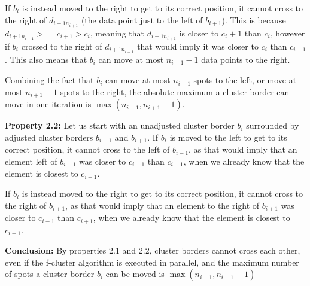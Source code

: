 \documentclass[conference]{IEEEtran}
\begin{document}
If $b_i$ is instead moved to the right to get to its correct position, it cannot cross to the right of $d_{i+1n_{i+1}}$ (the data point just to the left of $b_{i+1}$).
This is because $d_{i+1n_{i+1}} >= c_{i+1} > c_i$, meaning that $d_{i+1n_{i+1}}$ is closer to $c_i+1$ than $c_i$,
however if $b_i$ crossed to the right of $d_{i+1n_{i+1}}$ that would imply it was closer to $c_i$ than $c_{i+1}$.
This also means that $b_i$ can move at most $n_{i+1}-1$ data points to the right.

Combining the fact that $b_i$ can move at most $n_{i-1}$ spots to the left, or move at most $n_{i+1}-1$ spots to the right, the absolute maximum a cluster border can move in one iteration is $\max(n_{i-1}, n_{i+1}-1)$.

\textbf{Property 2.2:}
Let us start with an unadjusted cluster border $b_i$ surrounded by adjusted cluster borders $b_{i-1}$ and $b_{i+1}$.
If $b_i$ is moved to the left to get to its correct position, it cannot cross to the left of $b_{i-1}$,
as that would imply that an element left of $b_{i-1}$ was closer to $c_{i+1}$ than $c_{i-1}$, when we already know that the element is closest to $c_{i-1}$.

If $b_i$ is instead moved to the right to get to its correct position, it cannot cross to the right of $b_{i+1}$,
as that would imply that an element to the right of $b_{i+1}$ was closer to $c_{i-1}$ than $c_{i+1}$, when we already know that the element is closest to $c_{i+1}$.

\textbf{Conclusion:}
By properties 2.1 and 2.2, cluster borders cannot cross each other, even if the f-cluster algorithm is executed in parallel, and the maximum number of spots a cluster border $b_i$ can be moved is $\max(n_{i-1}, n_{i+1}-1)$
\end{document}
